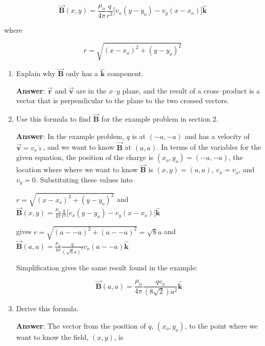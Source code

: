 \documentclass{article}
\newcommand{\ds}[0]{\displaystyle}
\newcommand{\ihat}[0]{\hat{\boldsymbol{\imath}}}
\newcommand{\khat}[0]{\hat{\boldsymbol{k}}}
\newcommand{\bfvec}[1]{\vec{\mathbf{#1}}}
\begin{document}
$$\bfvec{B}(x,y)= \frac{\mu_o}{4\pi} \frac{q}{r^3} \big[v_x(y-y_o) - v_y(x-x_o)\big]\khat$$

where

$$r=\sqrt{(x-x_o)^2+(y-y_o)^2}$$

\begin{enumerate}

  \item Explain why $\bfvec{B}$ only has a $\khat$ component.

        \ifsolutions
        \textbf{Answer}: $\bfvec{r}$ and $\bfvec{v}$ are in the $x$--$y$ plane, and the result of a cross--product is a vector that is perpendicular to the plane to the two crossed vectors.
        \else
        \vskip 36pt
        \fi

  \item Use this formula to find $\bfvec{B}$ for the example problem in section 2.

        \ifsolutions
        \textbf{Answer}: In the example problem, $q$ is at $(-a,-a)$ and has a velocity of $\bfvec{v}=v_o\ihat$, and we want to know $\bfvec{B}$ at $(a,a)$. In terms of the variables for the given equation, the position of the charge is $(x_o,y_o)=(-a,-a)$, the location where where we want to know $\bfvec{B}$ is $(x,y)=(a,a)$, $v_x=v_o$, and $v_y=0$. Substituting these values into

        \vskip 12pt

        $r=\sqrt{(x-x_o)^2+(y-y_o)^2}$
        and
        $\ds\bfvec{B}(x,y)= \frac{\mu_o}{4\pi} \frac{q}{r^3} \big[v_x(y-y_o) - v_y(x-x_o)\big]\khat$

        \vskip 12pt

        gives 
        $r=\sqrt{(a--a)^2+(a--a)^2}=\sqrt{8}a$
        and
        $\ds\bfvec{B}(a,a)= \frac{\mu_o}{4\pi} \frac{q}{(\sqrt{8}a)^3} v_o(a--a)\khat$

        \vskip 12pt

        Simplification gives the same result found in the example:

        \vskip 12pt

        $$
        \bfvec{B}(a,a) = \frac{\mu_o}{4\pi} \frac{qv_o}{(8\sqrt{2})a^2}\khat
        $$
        \else
        \vskip 96pt
        \fi

  \item Derive this formula.

        \ifsolutions
        \textbf{Answer}: 
        The vector from the position of $q$, $(x_o,y_o)$, to the point where we want to know the field, $(x,y)$, is


\end{enumerate}
\end{document}
